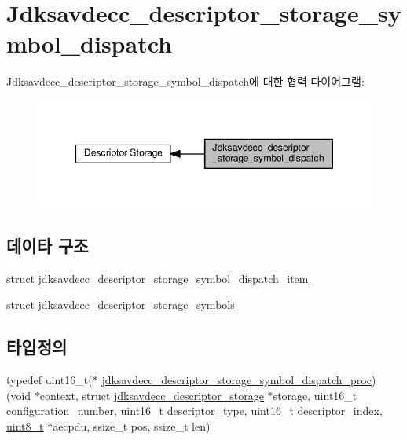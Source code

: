 \hypertarget{group__jdksavdecc__descriptor__storage__symbol__dispatch}{}\section{Jdksavdecc\+\_\+descriptor\+\_\+storage\+\_\+symbol\+\_\+dispatch}
\label{group__jdksavdecc__descriptor__storage__symbol__dispatch}
Jdksavdecc\+\_\+descriptor\+\_\+storage\+\_\+symbol\+\_\+dispatch에 대한 협력 다이어그램\+:
\nopagebreak
\begin{figure}[H]
\begin{center}
\leavevmode
\includegraphics[width=347pt]{group__jdksavdecc__descriptor__storage__symbol__dispatch}
\end{center}
\end{figure}
\subsection*{데이타 구조}
\begin{DoxyCompactItemize}
\item 
struct \hyperlink{structjdksavdecc__descriptor__storage__symbol__dispatch__item}{jdksavdecc\+\_\+descriptor\+\_\+storage\+\_\+symbol\+\_\+dispatch\+\_\+item}
\item 
struct \hyperlink{structjdksavdecc__descriptor__storage__symbols}{jdksavdecc\+\_\+descriptor\+\_\+storage\+\_\+symbols}
\end{DoxyCompactItemize}
\subsection*{타입정의}
\begin{DoxyCompactItemize}
\item 
typedef uint16\+\_\+t($\ast$ \hyperlink{group__jdksavdecc__descriptor__storage__symbol__dispatch_gaf1c817a8f34d849b268537e6093c69aa}{jdksavdecc\+\_\+descriptor\+\_\+storage\+\_\+symbol\+\_\+dispatch\+\_\+proc}) (void $\ast$context, struct \hyperlink{structjdksavdecc__descriptor__storage}{jdksavdecc\+\_\+descriptor\+\_\+storage} $\ast$storage, uint16\+\_\+t configuration\+\_\+number, uint16\+\_\+t descriptor\+\_\+type, uint16\+\_\+t descriptor\+\_\+index, \hyperlink{stdint_8h_aba7bc1797add20fe3efdf37ced1182c5}{uint8\+\_\+t} $\ast$aecpdu, ssize\+\_\+t pos, ssize\+\_\+t len)
\end{DoxyCompactItemize}

